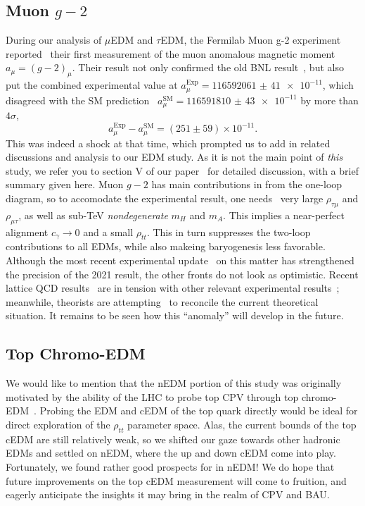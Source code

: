 \subsection{Muon \(g-2 \)}
During our analysis of \(\mu \)EDM and \(\tau \)EDM, the Fermilab Muon g-2 experiment reported~\cite{Fermilab2021MuonGminus2} their first measurement of the muon anomalous magnetic moment \(a_{\mu} = (g-2)_{\mu} \).
Their result not only confirmed the old BNL result~\cite{BNL2006MuonGminus2}, but also put the combined experimental value at \(a_{\mu}^{\text{Exp}} = \num{116592061(41)e-11} \),
which disagreed with the SM prediction~\cite{Aoyama2020MuonTheory} \(a_{\mu}^{\text{SM}} = \num{116591810(43)e-11} \) by more than \(4\sigma \),
\begin{equation}
    a_{\mu}^{\text{Exp}} - a_{\mu}^{\text{SM}} = (251 \pm 59) \times 10^{-11}.
\end{equation}
This was indeed a shock at that time, which prompted us to add in related discussions and analysis to our EDM study.
As it is not the main point of \textit{this} study, we refer you to section V of our paper~\cite{HKT2022MuonEDMTauEDM} for detailed discussion, with a brief summary given here.
Muon \(g-2 \) has main contributions in {\gthdm} from the one-loop diagram, so to accomodate the experimental result, 
one needs~\cite{HouEtal2021Muon} very large \(\rho_{\tau\mu} \) and \(\rho_{\mu\tau} \), as well as sub-TeV \textit{nondegenerate} \(m_{H} \) and \(m_{A} \).
This implies a near-perfect alignment \(c_{\gamma} \to 0\) and a small \(\rho_{tt} \).
This in turn suppresses the two-loop contributions to all EDMs, while also makeing baryogenesis less favorable.
Although the most recent experimental update~\cite{Muon2023Gminus2} on this matter has strengthened the precision of the 2021 result, 
the other fronts do not look as optimistic.
Recent lattice QCD results~\cite{Borsanyi2021Lattice} are in tension with other relevant experimental results~\cite{CMD32023eetopipi};
meanwhile, theorists are attempting~\cite{Colangelo2022Gminus2theory} to reconcile the current theoretical situation.
It remains to be seen how this ``anomaly'' will develop in the future.

\subsection{Top Chromo-EDM}
We would like to mention that the nEDM portion of this study was originally motivated by the ability of the LHC to probe top CPV through top chromo-EDM~\cite{CMS2023}.
Probing the EDM and cEDM of the top quark directly would be ideal for direct exploration of the \(\rho_{tt} \) parameter space.
Alas, the current bounds of the top cEDM are still relatively weak, so we shifted our gaze towards other hadronic EDMs and settled on nEDM, 
where the up and down cEDM come into play.
Fortunately, we found rather good prospects for {\gthdm} in nEDM!
We do hope that future improvements on the top cEDM measurement will come to fruition,
and eagerly anticipate the insights it may bring in the realm of CPV and BAU.

